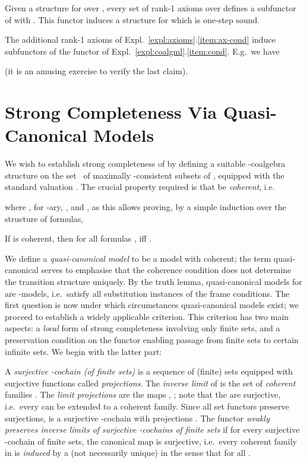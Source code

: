 \documentclass[proceedings]{stacs}
\theoremstyle{definition}
\theoremstyle{plain}
\begin{document}
Given a structure for  over , every set  of rank-1
axioms over  defines a subfunctor  of  with
. This functor induces a structure for which  is one-step
sound.
\begin{exa}\label{expl:subfunctors}
  The additional rank-1 axioms of
  Expl.~\ref{expl:axioms}.\ref{item:ax-cond} induce subfunctors
   of the functor  of
  Expl.~\ref{expl:coalgml}.\ref{item:cond}. E.g.\ we have
  
(it is an amusing exercise to verify the last claim).
\end{exa}

\section{Strong Completeness Via Quasi-Canonical Models}

\noindent 
We wish to establish strong completeness of  by defining a
suitable -coalgebra structure  on the set~ of maximally
-consistent subsets of , equipped with the
standard valuation . The crucial
property required is that  be \emph{coherent}, i.e.

where , for 
-ary, , and ,
as this allows proving, by a simple induction over the structure of
formulas,
\begin{lem}
  If  is coherent, then for all formulas ,
   iff .
\end{lem}
\noindent We define a \emph{quasi-canonical model} to be a model
 with  coherent; the term quasi-canonical serves
to emphasise that the coherence condition does not determine the
transition structure  uniquely. By the truth lemma,
quasi-canonical models for  are -models, i.e.\ satisfy
all substitution instances of the frame conditions. The first question
is now under which circumstances quasi-canonical models exist; we
proceed to establish a widely applicable criterion. This criterion has
two main aspects: a \emph{local} form of strong completeness involving
only finite sets, and a preservation condition on the functor enabling
passage from finite sets to certain infinite sets. We begin with the
latter part:
\begin{defi}
  A \emph{surjective -cochain (of finite sets)} is a sequence
   of (finite) sets equipped with surjective
  functions  called \emph{projections}. The
  \emph{inverse limit}  of  is the set
   of
  \emph{coherent} families . The \emph{limit projections} are
  the maps , ; note that the
   are surjective, i.e.\ every  can be extended to a
  coherent family. Since all set functors preserve surjections,
   is a surjective -cochain with projections
  . The functor  \emph{weakly preserves inverse limits of
    surjective -cochains of finite sets} if for every
  surjective -cochain  of finite sets, the canonical
  map  is surjective, i.e.\ every
  coherent family  in  is \emph{induced} by a (not
  necessarily unique)  in the sense that
   for all .
\end{defi}
\end{document}
